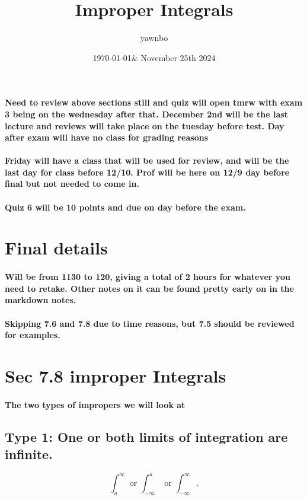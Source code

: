 \documentclass[a4paper]{article}
\title{Improper Integrals}
\author{yawnbo}
\date{\today \& November 25th 2024}
\begin{document}
\paragraph{Need to review above sections still and quiz will open tmrw with exam 3 being on the wednesday after that. December 2nd will be the last lecture and reviews will take place on the tuesday before test. Day after exam will have no class for grading reasons}

\paragraph{Friday will have a class that will be used for review, and will be the last day for class before 12/10. Prof will be here on 12/9 day before final but not needed to come in.}
\paragraph{Quiz 6 will be 10 points and due on day before the exam.}

\section{Final details}%
\label{sec:Final details}

\paragraph{Will be from 1130 to 120, giving a total of 2 hours for whatever you need to retake. Other notes on it can be found pretty early on in the markdown notes. }

\paragraph{Skipping 7.6 and 7.8 due to time reasons, but 7.5 should be reviewed for examples.}

\section{Sec 7.8 improper Integrals}%
\label{sec:Sec 7.8 improper Integrals}
\paragraph{The two types of impropers we will look at}
\subsection{Type 1: One or both limits of integration are infinite.}%
\label{sub:Type 1: One or both limits of integration are infinite.}
\[
\int_{a}^{\infty} \text{ or } \int_{-\infty}^{a} \text{ or }\int_{-\infty}^{\infty}
.\] 
\end{document}

